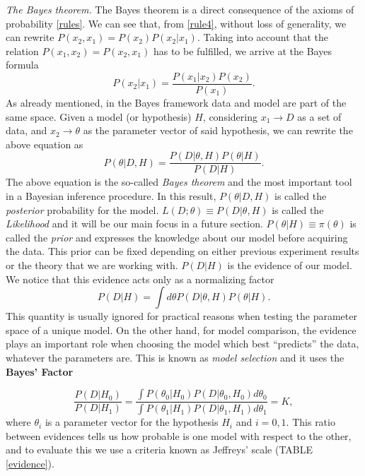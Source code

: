 \documentclass[onecolumn,           %
               showpacs,            %
               preprintnumbers,     %
               aps,                 %
               letterpaper,             %
               superscriptaddress,      %
               nofootinbib,         %
               tightenlines,        %
               floats,floatfix      %
               ,usenatbib,
               ]{revtex4-1}
\begin{document}
\textit{The Bayes theorem.} The Bayes theorem is a direct consequence of the axioms of probability \eqref{rules}. We can see that, from \eqref{rule4}, without loss of generality, we can rewrite $P(x_2,x_1)=P(x_2)P(x_2|x_1)$. Taking into account that the relation $P(x_1,x_2)=P(x_2,x_1)$ has to be fulfilled, we arrive at the Bayes formula   
\begin{equation}
P(x_2|x_1)=\frac{P(x_1|x_2)P(x_2)}{P(x_1)}.
\end{equation}
As already mentioned, in the Bayes framework data and model are part of the same space. Given a model (or hypothesis) $H$, considering $x_1\rightarrow D$ as a set of data, and $x_2\rightarrow \theta$ as the parameter vector of said hypothesis, we can rewrite the above equation as
\begin{equation}\label{BayesT}
P(\theta|D, H)=\frac{P(D|\theta,H)P(\theta|H)}{P(D|H)}.
\end{equation}
The above equation is the so-called \textit{Bayes theorem} and the most important tool in a Bayesian inference procedure. In this result, $P(\theta|D, H)$ is called the \textit{posterior} probability for the model. $L(D;\theta)\equiv P(D|\theta,H)$ is called the \textit{Likelihood} and it will be our main focus in a future section. $P(\theta|H)\equiv \pi(\theta)$ is called the \textit{prior} and expresses the knowledge about our model before acquiring the data. This prior can be fixed depending on either previous experiment results or the theory that we are working with. $P(D|H)$ is the evidence of our model. We notice that this evidence acts only as a normalizing factor
\begin{equation}\label{PD}
P(D|H)=\int d\theta P(D|\theta,H)P(\theta|H).
\end{equation}
This quantity is usually ignored for practical reasons when testing the parameter space of a unique model. On the other hand, for model comparison, the evidence plays an important role when choosing the model which best ``predicts'' the data, whatever the parameters are. This is known as \textit{model selection} and it uses the \textbf{Bayes' Factor}

\begin{equation}\label{bayesfactor}
\frac{P(D\vert H_0)}{P(D\vert H_1)}= \frac{\int P(\theta_0\vert H_0)P(D\vert\theta_0, H_0)d\theta_0}{\int P(\theta_1\vert H_1)P(D\vert\theta_1, H_1)d\theta_1}=K,
\end{equation}
where $\theta_i$ is a parameter vector for the hypothesis $H_i$ and $i=0,1$. This ratio between evidences tells us how probable is one model with respect to the other, and to evaluate this we use a criteria known as Jeffreys' scale (TABLE \ref{evidence}). 
\end{document}
